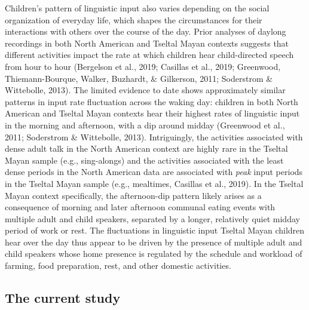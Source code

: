 \documentclass[
  english,
  ,man,floatsintext]{apa6}
\begin{document}
Children's pattern of linguistic input also varies depending on the social organization of everyday life, which shapes the circumstances for their interactions with others over the course of the day. Prior analyses of daylong recordings in both North American and Tseltal Mayan contexts suggests that different activities impact the rate at which children hear child-directed speech from hour to hour (Bergelson et al., 2019; Casillas et al., 2019; Greenwood, Thiemann-Bourque, Walker, Buzhardt, \& Gilkerson, 2011; Soderstrom \& Wittebolle, 2013). The limited evidence to date shows approximately similar patterns in input rate fluctuation across the waking day: children in both North American and Tseltal Mayan contexts hear their highest rates of linguistic input in the morning and afternoon, with a dip around midday (Greenwood et al., 2011; Soderstrom \& Wittebolle, 2013). Intriguingly, the activities associated with dense adult talk in the North American context are highly rare in the Tseltal Mayan sample (e.g., sing-alongs) and the activities associated with the least dense periods in the North American data are associated with \emph{peak} input periods in the Tseltal Mayan sample (e.g., mealtimes, Casillas et al., 2019). In the Tseltal Mayan context specifically, the afternoon-dip pattern likely arises as a consequence of morning and later afternoon communal eating events with multiple adult and child speakers, separated by a longer, relatively quiet midday period of work or rest. The fluctuations in linguistic input Tseltal Mayan children hear over the day thus appear to be driven by the presence of multiple adult and child speakers whose home presence is regulated by the schedule and workload of farming, food preparation, rest, and other domestic activities.

\hypertarget{the-current-study}{%
\subsection{The current study}\label{the-current-study}}
\end{document}
